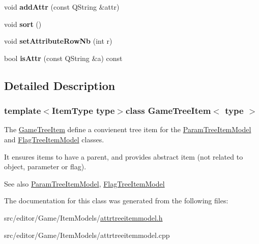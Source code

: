 \begin{DoxyCompactItemize}
\item 
\hypertarget{class_game_tree_item_a481dca9119375cc451e7c417e4a5c20c}{void {\bfseries add\-Attr} (const \-Q\-String \&attr)}\label{class_game_tree_item_a481dca9119375cc451e7c417e4a5c20c}

\item 
\hypertarget{class_game_tree_item_a54406ecaa6df19518a92c1a24c41c4d6}{void {\bfseries sort} ()}\label{class_game_tree_item_a54406ecaa6df19518a92c1a24c41c4d6}

\item 
\hypertarget{class_game_tree_item_a78b97c3f6767adb7cb122bb86494bb24}{void {\bfseries set\-Attribute\-Row\-Nb} (int r)}\label{class_game_tree_item_a78b97c3f6767adb7cb122bb86494bb24}

\item 
\hypertarget{class_game_tree_item_a842c2f95f1496f6d6d35c5047d880168}{bool {\bfseries is\-Attr} (const \-Q\-String \&a) const }\label{class_game_tree_item_a842c2f95f1496f6d6d35c5047d880168}

\end{DoxyCompactItemize}


\subsection{\-Detailed \-Description}
\subsubsection*{template$<$\-Item\-Type type$>$class Game\-Tree\-Item$<$ type $>$}

\-The \hyperlink{class_game_tree_item}{\-Game\-Tree\-Item} define a convienent tree item for the \hyperlink{class_param_tree_item_model}{\-Param\-Tree\-Item\-Model} and \hyperlink{class_flag_tree_item_model}{\-Flag\-Tree\-Item\-Model} classes. 

\-It ensures items to have a parent, and provides abstract item (not related to object, parameter or flag).

\begin{DoxySeeAlso}{\-See also}
\hyperlink{class_param_tree_item_model}{\-Param\-Tree\-Item\-Model}, \hyperlink{class_flag_tree_item_model}{\-Flag\-Tree\-Item\-Model} 
\end{DoxySeeAlso}


\-The documentation for this class was generated from the following files\-:\begin{DoxyCompactItemize}
\item 
src/editor/\-Game/\-Item\-Models/\hyperlink{attrtreeitemmodel_8h}{attrtreeitemmodel.\-h}\item 
src/editor/\-Game/\-Item\-Models/attrtreeitemmodel.\-cpp\end{DoxyCompactItemize}
